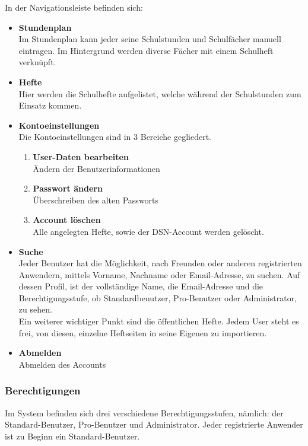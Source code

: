 In der Navigationsleiste befinden sich:
\begin{itemize}
\item \textbf{Stundenplan}\\ Im Stundenplan kann jeder seine Schulstunden und Schulfächer manuell eintragen. Im Hintergrund werden diverse Fächer mit einem Schulheft verknüpft.
\item \textbf{Hefte}\\ Hier werden die Schulhefte aufgelistet, welche während der Schulstunden zum Einsatz kommen.
\item \textbf{Kontoeinstellungen}\\ Die Kontoeinstellungen sind in 3 Bereiche gegliedert.
\begin{enumerate}
\item \textbf{User-Daten bearbeiten}\\ Ändern der Benutzerinformationen
\item \textbf{Passwort ändern}\\ Überschreiben des alten Passworts
\item \textbf{Account löschen}\\ Alle angelegten Hefte, sowie der DSN-Account werden gelöscht.
\end{enumerate}
\item \textbf{Suche}\\ Jeder Benutzer hat die Möglichkeit, nach Freunden oder anderen registrierten Anwendern, mittels Vorname, Nachname oder Email-Adresse, zu suchen. Auf dessen Profil, ist der vollständige Name, die Email-Adresse und die Berechtigungsstufe, ob Standardbenutzer, Pro-Benutzer oder Administrator, zu sehen.\\
Ein weiterer wichtiger Punkt sind die öffentlichen Hefte. Jedem User steht es frei, von diesen, einzelne Heftseiten in seine Eigenen zu importieren.
\item \textbf{Abmelden}\\ Abmelden des Accounts
\end{itemize}
\newpage 

\subsubsection{Berechtigungen}
Im System befinden sich drei verschiedene Berechtigungsstufen, nämlich: der Standard-Benutzer, Pro-Benutzer und Administrator. Jeder registrierte Anwender ist zu Beginn ein Standard-Benutzer.

